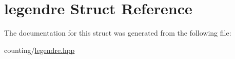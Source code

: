 \hypertarget{structlegendre}{}\section{legendre Struct Reference}
\label{structlegendre}


The documentation for this struct was generated from the following file\+:\begin{DoxyCompactItemize}
\item 
counting/\mbox{\hyperlink{legendre_8hpp}{legendre.\+hpp}}\end{DoxyCompactItemize}
